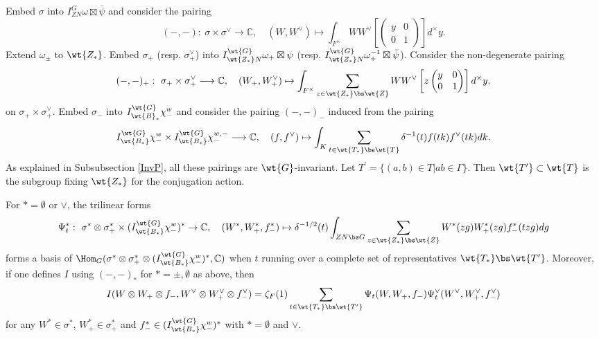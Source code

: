 \documentclass[11pt,reqno]{amsart}
\newcommand{\BC}{{\mathbb {C}}} \newcommand{\BD}{{\mathbb {D}}}
\newcommand{\lra}{\longrightarrow}\newcommand{\lla}{\longleftarrow}
\theoremstyle{plain}
\theoremstyle{remark} \newtheorem{remark}[thm]{Remark}
\theoremstyle{definition} \newtheorem{exercise}[thm]{Exercise}
\theoremstyle{definition} \newtheorem{example}[thm]{Example} \newtheorem{condition}[thm]{Condition}
\numberwithin{equation}{section}
\renewcommand{\-}{\text{--}}
\begin{document}
Embed $\sigma$ into $I_{ZN}^G\omega\boxtimes\bar{\psi}$
and consider the pairing 
\[(-,-):\ \sigma\times\sigma^\vee\lra\BC,\quad (W,W^\vee)\mapsto\int_{F^\times}WW^\vee\left[\begin{pmatrix}y & 0\\ 0 & 1\end{pmatrix}\right]d^\times y.\] 
Extend $\omega_{\pm}$ to $\wt{Z_*}$. Embed $\sigma_+$ (resp. $\sigma_+^\vee$) into $I_{\wt{Z_*}N}^{\wt{G}}\omega_{+}\boxtimes\psi$ (resp. $I_{\wt{Z_*}N}^{\wt{G}}\omega_{+}^{-1}\boxtimes\bar{\psi}$).
Consider the non-degenerate pairing \[(-,-)_+:\ \sigma_+\times\sigma_+^\vee\lra\BC, \quad (W_+,W_+^\vee)\mapsto\int_{F^\times}\sum_{z\in\wt{Z_*}\bs\wt{Z}}WW^\vee\left[z\begin{pmatrix}y &0 \\ 0 & 1\end{pmatrix}\right]d^\times y.\] on $\sigma_{+}\times\sigma_{+}^\vee$. 
Embed $\sigma_-$ into $I_{\wt{B}_*}^{\wt{G}}\chi_-^w$ and consider the pairing $(-,-)_-$ induced from the pairing 
\[I_{\wt{B_*}}^{\wt{G}}\chi_-^w\times I_{\wt{B_*}}^{\wt{G}}\chi_-^{w,-}\lra\BC,\quad (f,f^\vee)\mapsto\int_{K}\sum_{t\in \wt{T_*}\bs \wt{T}}\delta^{-1}(t)f(tk)f^\vee(tk)dk.\]
As explained in Subsubsection \ref{InvP}, all these pairings are $\wt{G}$-invariant.
Let $T^\prime=\{(a,b)\in T| ab\in\Gamma\}$. Then $\wt{T^\prime}\subset\wt{T}$ is the subgroup fixing $\wt{Z_*}$ for the conjugation action.  
\begin{prop}\label{Tri-I}
For $*=\emptyset$ or $\vee$, the trilinear forms 
\[\Psi_t^*:\ \sigma^*\otimes\sigma_+^*\times (I_{\wt{B_*}}^{\wt{G}}\chi_-^{w})^*\to\BC,\quad (W^*,W_+^*,f_-^*)\mapsto\delta^{-1/2}(t)\int_{ZN\bs G}\sum_{z\in \wt{Z_*}\bs\wt{Z}}W^*(zg)W_+^*(zg)f_-^*(tzg)dg\]
forms a basis of $\Hom_{G}(\sigma^*\otimes\sigma_+^*\otimes (I_{\wt{B_*}}^{\wt{G}}\chi^{w}_-)^*,\BC)$ when $t$ running over a complete set  of representatives $\wt{T_*}\bs \wt{T'}$. Moreover, if one defines $I$ using $(-,-)_*$ for $*=\pm,\emptyset$ as above, then 
\[I(W\otimes W_+\otimes f_-, W^\vee\otimes W_+^\vee\otimes f_-^\vee)=\zeta_F(1)\sum_{t\in \wt{T_*}\bs \wt{T^\prime}}\Psi_t(W,W_+,f_-)\Psi_t^\vee(W^\vee,W_+^\vee,f_-^\vee)\]
for any $W^* \in \sigma^*$, $W_+^* \in \sigma_+^*$
and $f_-^* \in (I_{\wt{B_*}}^{\wt{G}}\chi^{w}_-)^*$ with $* = 
\emptyset$ and $\vee$.
\end{prop}
\end{document}
